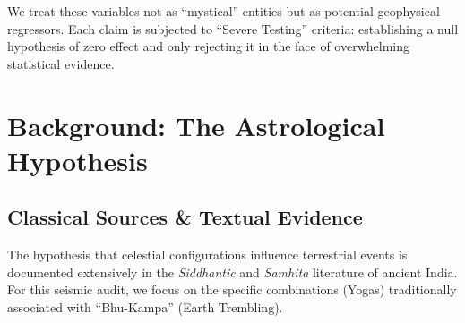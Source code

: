\documentclass[
  11pt,
  a4paper,
  oneside,
  openany]{article}
\begin{document}
We treat these variables not as ``mystical'' entities but as potential
geophysical regressors. Each claim is subjected to ``Severe Testing''
criteria: establishing a null hypothesis of zero effect and only
rejecting it in the face of overwhelming statistical evidence.

\section{Background: The Astrological
Hypothesis}\label{background-the-astrological-hypothesis}

\subsection{Classical Sources \& Textual
Evidence}\label{classical-sources-textual-evidence}

The hypothesis that celestial configurations influence terrestrial
events is documented extensively in the \emph{Siddhantic} and
\emph{Samhita} literature of ancient India. For this seismic audit, we
focus on the specific combinations (Yogas) traditionally associated with
``Bhu-Kampa'' (Earth Trembling).
\end{document}
